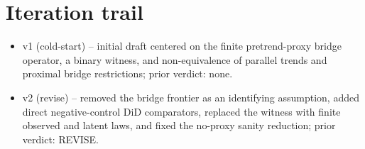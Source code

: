 \documentclass[11pt]{article}
\theoremstyle{definition}
\theoremstyle{plain}
\theoremstyle{remark}
\begin{document}
\section{Iteration trail}
\begin{itemize}[leftmargin=*]
\item v1 (cold-start) -- initial draft centered on the finite pretrend-proxy bridge operator, a binary witness, and non-equivalence of parallel trends and proximal bridge restrictions; prior verdict: none.
\item v2 (revise) -- removed the bridge frontier as an identifying assumption, added direct negative-control DiD comparators, replaced the witness with finite observed and latent laws, and fixed the no-proxy sanity reduction; prior verdict: REVISE.
\end{itemize}
\end{document}
